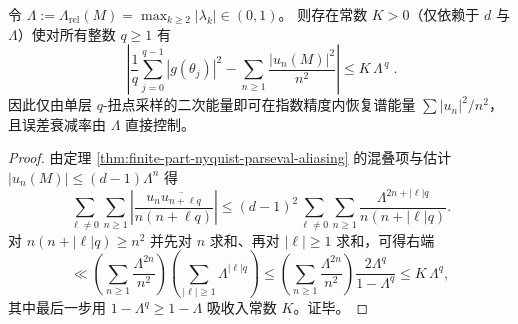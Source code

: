 \begin{corollary}\label{cor:finite-part-nyquist-error-exp}
令 \(\Lambda:=\Lambda_{\mathrm{rel}}(M)=\max_{k\ge 2}|\lambda_k|\in(0,1)\)。
则存在常数 \(K>0\)（仅依赖于 \(d\) 与 \(\Lambda\)）使对所有整数 \(q\ge 1\) 有
\[
\boxed{\;
\left|\frac{1}{q}\sum_{j=0}^{q-1}|g(\theta_j)|^2-\sum_{n\ge 1}\frac{|u_n(M)|^2}{n^2}\right|
\le K\,\Lambda^{\,q}\; }.
\]
因此仅由单层 \(q\)-扭点采样的二次能量即可在指数精度内恢复谱能量 \(\sum |u_n|^2/n^2\)，且误差衰减率由 \(\Lambda\) 直接控制。
\end{corollary}
\begin{proof}
由定理 \ref{thm:finite-part-nyquist-parseval-aliasing} 的混叠项与估计 \(|u_n(M)|\le (d-1)\Lambda^{n}\) 得
\[
\sum_{\ell\ne 0}\sum_{n\ge 1}\left|\frac{u_n\overline{u_{n+\ell q}}}{n(n+\ell q)}\right|
\le
(d-1)^2\sum_{\ell\ne 0}\sum_{n\ge 1}\frac{\Lambda^{2n+|\ell|q}}{n(n+|\ell|q)}.
\]
对 \(n(n+|\ell|q)\ge n^2\) 并先对 \(n\) 求和、再对 \(|\ell|\ge 1\) 求和，可得右端
\[
\ll
\left(\sum_{n\ge 1}\frac{\Lambda^{2n}}{n^2}\right)\left(\sum_{|\ell|\ge 1}\Lambda^{|\ell|q}\right)
\le
\left(\sum_{n\ge 1}\frac{\Lambda^{2n}}{n^2}\right)\frac{2\Lambda^{q}}{1-\Lambda^{q}}
\le
K\,\Lambda^{q},
\]
其中最后一步用 \(1-\Lambda^{q}\ge 1-\Lambda\) 吸收入常数 \(K\)。证毕。
\end{proof}
